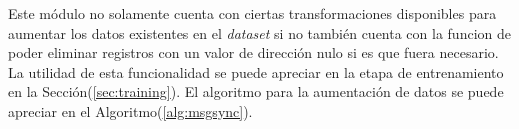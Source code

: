     \begin{table}[!h]
        \centering
        \caption{Transformaciones realizadas en la aumentación de datos. Fuente: Elaboración propia.}
    \label{tbl:transf}
    \end{table}

    Este módulo no solamente cuenta con ciertas transformaciones disponibles para aumentar los datos existentes en el \textit{dataset}
    si no también cuenta con la funcion de poder eliminar registros con un valor de dirección nulo si es que fuera necesario. La utilidad
    de esta funcionalidad se puede apreciar en la etapa de entrenamiento en la Sección(\ref{sec:training}). El algoritmo para 
    la aumentación de datos se puede apreciar en el Algoritmo(\ref{alg:msgsync}).

